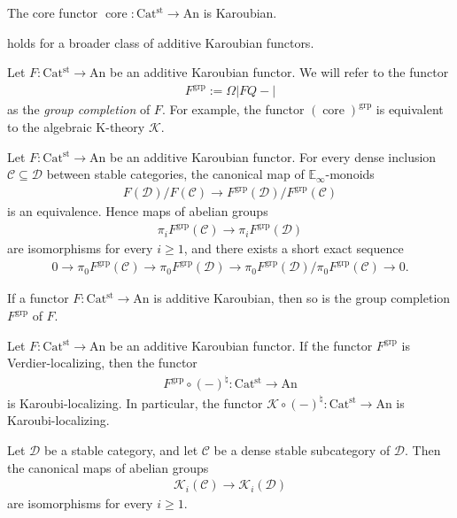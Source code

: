 \documentclass[a4paper,dvipdfmx,11pt,reqno]{amsart}
\DeclareMathOperator{\core}{core}
\DeclareMathOperator{\grp}{grp}
\newcommand{\C}{\mathcal{C}}
\newcommand{\D}{\mathcal{D}}
\newcommand{\K}{\mathcal{K}}
\newcommand{\An}{\mathrm{An}}
\newcommand{\Catst}{\mathrm{Cat^{st}}}
\newcommand{\Einf}{\mathbb{E}_{\infty}}
\begin{document}
\begin{example}
  The core functor $\core : \Catst \to \An$ is Karoubian.
\end{example}

 holds for a broader class of additive Karoubian functors.

\begin{notation}
  Let $F : \Catst \to \An$ be an additive Karoubian functor.
  We will refer to the functor
  \begin{align*}
    F^{\grp} := \Omega|FQ-|
  \end{align*}
  as the \textit{group completion} of $F$.
  For example, the functor $(\core)^{\grp}$ is equivalent to the algebraic K-theory $\K$.
\end{notation}

\begin{theorem}
  Let $F : \Catst \to \An$ be an additive Karoubian functor.
  For every dense inclusion $\C \subseteq \D$ between stable categories, the canonical map of $\Einf$-monoids
  \begin{align*}
    F(\D)/F(\C) \to F^{\grp}(\D)/F^{\grp}(\C)
  \end{align*}
  is an equivalence.
  Hence maps of abelian groups
  \begin{align*}
    \pi_iF^{\grp}(\C) \to \pi_iF^{\grp}(\D)
  \end{align*}
  are isomorphisms for every $i \geq 1$, and there exists a short exact sequence 
  \begin{align*}
    0 \to \pi_0F^{\grp}(\C) \to \pi_0F^{\grp}(\D) \to \pi_0F^{\grp}(\D)/\pi_0F^{\grp}(\C) \to 0.
  \end{align*}
\end{theorem}

\begin{corollary}
  If a functor $F : \Catst \to \An$ is additive Karoubian, then so is the group completion $F^{\grp}$ of $F$.
\end{corollary}

\begin{corollary} \label{cor.group_completion_is_Karaubi_localizing}
  Let $F : \Catst \to \An$ be an additive Karoubian functor.
  If the functor $F^{\grp}$ is Verdier-localizing, then the functor
  \begin{align*}
    F^{\grp} \circ (-)^{\natural} : \Catst \to \An
  \end{align*}
  is Karoubi-localizing.
  In particular, the functor $\K \circ (-)^{\natural} : \Catst \to \An$ is Karoubi-localizing.
\end{corollary}

\begin{corollary}
  Let $\D$ be a stable category, and let $\C$ be a dense stable subcategory of $\D$.
  Then the canonical maps of abelian groups
  \begin{align*}
    \K_i(\C) \to \K_i(\D)
  \end{align*}
  are isomorphisms for every $i \geq 1$.
\end{corollary}

\printbibliography
\end{document}
